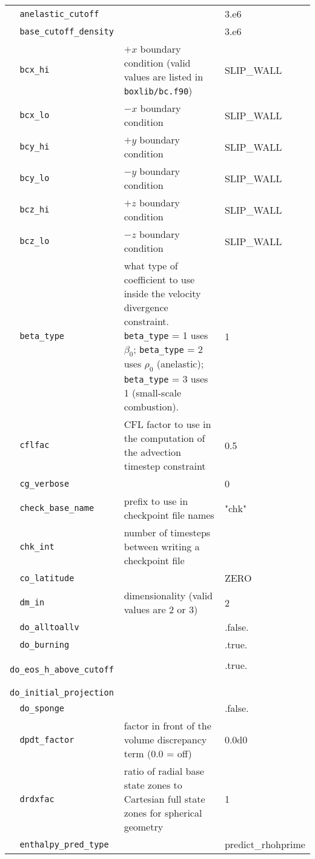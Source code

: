 {\begin{center}
\begin{longtable}{|l|p{3.25in}|l|}
\verb=  anelastic_cutoff =  &   &  3.e6 \\
\verb=  base_cutoff_density =  &   &  3.e6 \\
\verb=  bcx_hi =  & $+x$ boundary condition (valid values are listed in {\tt  boxlib/bc.f90})  &  SLIP\_WALL \\
\verb=  bcx_lo =  & $-x$ boundary condition  &  SLIP\_WALL \\
\verb=  bcy_hi =  & $+y$ boundary condition  &  SLIP\_WALL \\
\verb=  bcy_lo =  & $-y$ boundary condition  &  SLIP\_WALL \\
\verb=  bcz_hi =  & $+z$ boundary condition  &  SLIP\_WALL \\
\verb=  bcz_lo =  & $-z$ boundary condition  &  SLIP\_WALL \\
\verb=  beta_type =  & what type of coefficient to use inside the velocity divergence constraint.  
                       {\tt beta\_type} = 1 uses $\beta_0$; {\tt beta\_type} = 2 uses $\rho_0$ (anelastic);
                       {\tt beta\_type} = 3 uses 1 (small-scale combustion).  &  1 \\
\verb=  cflfac =  & CFL factor to use in the computation of the advection timestep constraint  &  0.5 \\
\verb=  cg_verbose =  &   &  0 \\
\verb=  check_base_name =  & prefix to use in checkpoint file names  &  "chk" \\
\verb=  chk_int =  & number of timesteps between writing a checkpoint file  &  \\
\verb=  co_latitude =  &   &  ZERO \\
\verb=  dm_in =  & dimensionality (valid values are 2 or 3)  &  2 \\
\verb=  do_alltoallv =  &   &  .false. \\
\verb=  do_burning =  &   &  .true. \\
\verb=  do_eos_h_above_cutoff =  &   &  .true. \\
\verb=  do_initial_projection =  &   &  \\
\verb=  do_sponge =  &   &  .false. \\
\verb=  dpdt_factor =  & factor in front of the volume discrepancy term (0.0 = off)  &  0.0d0 \\
\verb=  drdxfac =  & ratio of radial base state zones to Cartesian full state zones for spherical geometry  &  1 \\
\verb=  enthalpy_pred_type =  &   &  predict\_rhohprime \\

\end{longtable}
\end{center}}
